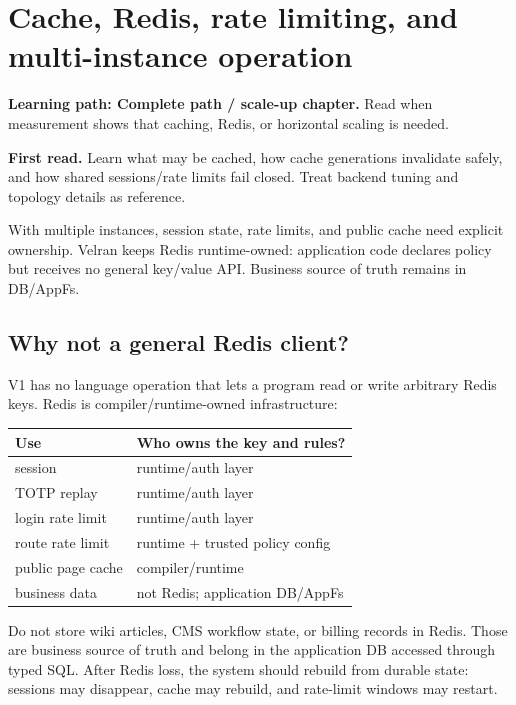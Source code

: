 \chapter{Cache, Redis, rate limiting, and multi-instance operation}

\noindent\textbf{Learning path: Complete path / scale-up chapter.} Read when measurement shows that caching, Redis, or horizontal scaling is needed.\par\medskip

\noindent\textbf{First read.} Learn what may be cached, how cache generations invalidate safely, and how shared sessions/rate limits fail closed. Treat backend tuning and topology details as reference.\par\medskip

With multiple instances, session state, rate limits, and public cache need explicit ownership. Velran keeps Redis runtime-owned: application code declares policy but receives no general key/value API. Business source of truth remains in DB/AppFs.

\section{Why not a general Redis client?}

V1 has no language operation that lets a program read or write arbitrary Redis keys. Redis is compiler/runtime-owned infrastructure:

\begin{center}
\begin{tabularx}{\textwidth}{@{}L{0.27\textwidth}Y@{}}
\toprule
\textbf{Use} & \textbf{Who owns the key and rules?} \\
\midrule
session & runtime/auth layer \\
TOTP replay & runtime/auth layer \\
login rate limit & runtime/auth layer \\
route rate limit & runtime + trusted policy config \\
public page cache & compiler/runtime \\
business data & not Redis; application DB/AppFs \\
\bottomrule
\end{tabularx}
\end{center}

Do not store wiki articles, CMS workflow state, or billing records in Redis. Those are business source of truth and belong in the application DB accessed through typed SQL. After Redis loss, the system should rebuild from durable state: sessions may disappear, cache may rebuild, and rate-limit windows may restart.

